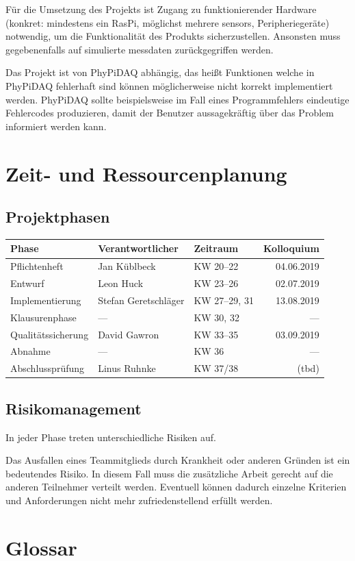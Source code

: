 \documentclass[parskip=full]{scrartcl}
\begin{document}
Für die Umsetzung des Projekts ist Zugang zu funktionierender Hardware (konkret: mindestens ein \gls{RasPi}, möglichst mehrere \glspl{sensor}, Peripheriegeräte) notwendig, um die Funktionalität des Produkts sicherzustellen.\newline
Ansonsten muss gegebenenfalls auf simulierte \gls{messdaten} zurückgegriffen werden.

Das Projekt ist von \gls{PhyPiDAQ} abhängig, das heißt Funktionen welche in PhyPiDAQ fehlerhaft sind können möglicherweise nicht korrekt implementiert werden. PhyPiDAQ sollte beispielsweise im Fall eines Programmfehlers eindeutige Fehlercodes produzieren, damit der Benutzer aussagekräftig über das Problem informiert werden kann.

\clearpage
\section{Zeit- und Ressourcenplanung}\label{zeit}

\subsection{Projektphasen}

\begin{tabular}{| l | l | l | r |}
	\hline
	\textbf{Phase} & \textbf{Verantwortlicher} & \textbf{Zeitraum} & \textbf{Kolloquium} \\ \hline
	Pflichtenheft & Jan Küblbeck & KW 20–22 & 04.06.2019 \\
	Entwurf & Leon Huck & KW 23–26 & 02.07.2019 \\
	Implementierung & Stefan Geretschläger & KW 27–29, 31 & 13.08.2019 \\
	Klausurenphase & — & KW 30, 32 & — \\
	Qualitätssicherung & David Gawron & KW 33–35 & 03.09.2019 \\
	Abnahme & — & KW 36 & — \\
	Abschlussprüfung & Linus Ruhnke & KW 37/38 & (tbd) \\
	\hline
\end{tabular}

\subsection{Risikomanagement}

In jeder Phase treten unterschiedliche Risiken auf.

Das Ausfallen eines Teammitglieds durch Krankheit oder anderen Gründen ist ein bedeutendes Risiko. In diesem Fall muss die zusätzliche Arbeit gerecht auf die anderen Teilnehmer verteilt werden. Eventuell können dadurch einzelne Kriterien und Anforderungen nicht mehr zufriedenstellend erfüllt werden.

\clearpage
\section{Glossar}\label{glossar}

\renewcommand*{\glossarysection}[2][]{}	%
\printnoidxglossaries				%
\end{document}
